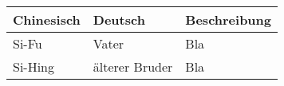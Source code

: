 \glsaddall%
\cleardoublepage
{}
\printglossaries


\begin{center}
	\begin{tabular}{l|l|l}
		\textbf{Chinesisch}	& \textbf{Deutsch}	& \textbf{Beschreibung} \\ \hline \hline
		Si-Fu				& Vater				& Bla \\ \hline
		Si-Hing				& \"alterer Bruder	& Bla \\
	\end{tabular}
\end{center}




\cleardoublepage
{}

\printindex






